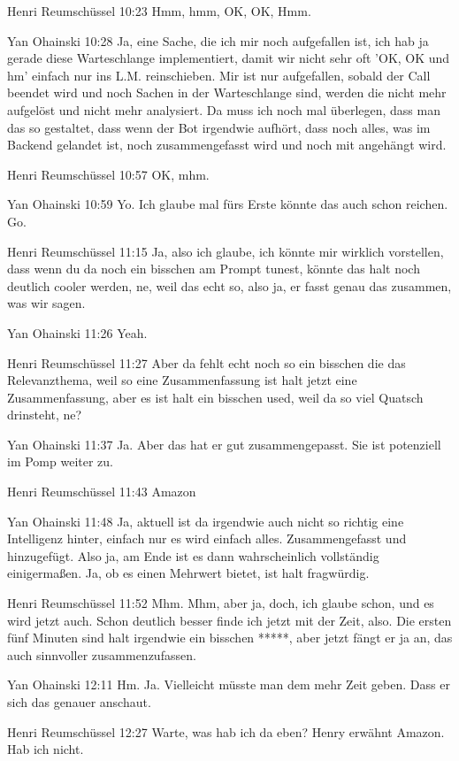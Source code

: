 Henri Reumschüssel   10:23
Hmm, hmm, OK, OK, Hmm.

Yan Ohainski   10:28
Ja, eine Sache, die ich mir noch aufgefallen ist, ich hab ja gerade diese Warteschlange implementiert, damit wir nicht sehr oft 'OK, OK und hm' einfach nur ins L.M. reinschieben. Mir ist nur aufgefallen, sobald der Call beendet wird und noch Sachen in der Warteschlange sind, werden die nicht mehr aufgelöst und nicht mehr analysiert.
Da muss ich noch mal überlegen, dass man das so gestaltet, dass wenn der Bot irgendwie aufhört, dass noch alles, was im Backend gelandet ist, noch zusammengefasst wird und noch mit angehängt wird.

Henri Reumschüssel   10:57
OK, mhm.

Yan Ohainski   10:59
Yo.
Ich glaube mal fürs Erste könnte das auch schon reichen.
Go.

Henri Reumschüssel   11:15
Ja, also ich glaube, ich könnte mir wirklich vorstellen, dass wenn du da noch ein bisschen am Prompt tunest, könnte das halt noch deutlich cooler werden, ne, weil das echt so, also ja, er fasst genau das zusammen, was wir sagen.

Yan Ohainski   11:26
Yeah.

Henri Reumschüssel   11:27
Aber da fehlt echt noch so ein bisschen die das Relevanzthema, weil so eine Zusammenfassung ist halt jetzt eine Zusammenfassung, aber es ist halt ein bisschen used, weil da so viel Quatsch drinsteht, ne?

Yan Ohainski   11:37
Ja.
Aber das hat er gut zusammengepasst. Sie ist potenziell im Pomp weiter zu.

Henri Reumschüssel   11:43
Amazon

Yan Ohainski   11:48
Ja, aktuell ist da irgendwie auch nicht so richtig eine Intelligenz hinter, einfach nur es wird einfach alles. Zusammengefasst und hinzugefügt. Also ja, am Ende ist es dann wahrscheinlich vollständig einigermaßen. Ja, ob es einen Mehrwert bietet, ist halt fragwürdig.

Henri Reumschüssel   11:52
Mhm.
Mhm, aber ja, doch, ich glaube schon, und es wird jetzt auch.
Schon deutlich besser finde ich jetzt mit der Zeit, also.
Die ersten fünf Minuten sind halt irgendwie ein bisschen *****, aber jetzt fängt er ja an, das auch sinnvoller zusammenzufassen.

Yan Ohainski   12:11
Hm.
Ja.
Vielleicht müsste man dem mehr Zeit geben.
Dass er sich das genauer anschaut.

Henri Reumschüssel   12:27
Warte, was hab ich da eben? Henry erwähnt Amazon.
Hab ich nicht.

